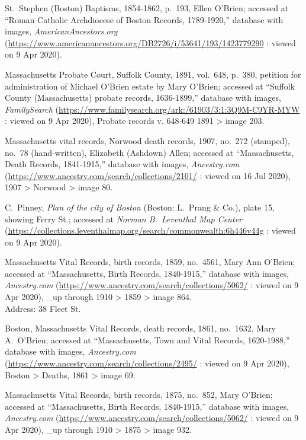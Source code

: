 \begin{thebibliography}{999}
	St.\ Stephen (Boston) Baptisms, 1854-1862, p.\ 193, Ellen O'Brien; accessed at ``Roman Catholic Archdiocese of Boston Records, 1789-1920,'' database with images, \textit{AmericanAncestors.org} (\url{https://www.americanancestors.org/DB2726/i/53641/193/1423779290} : viewed on 9 Apr 2020).
	
	Massachusetts Probate Court, Suffolk County, 1891, vol.\ 648, p.\ 380, petition for administration of Michael O'Brien estate by Mary O'Brien; accessed at ``Suffolk County (Massachusetts) probate records, 1636-1899,'' database with images, \textit{FamilySearch} (\url{https://www.familysearch.org/ark:/61903/3:1:3Q9M-C9YR-MYW} : viewed on 9 Apr 2020), Probate records v. 648-649 1891 > image 203.
	
	Massachusetts vital records, Norwood death records, 1907, no.\ 272 (stamped), no.\ 78 (hand-written), Elizabeth (Ashdown) Allen; accessed at ``Massachusetts, Death Records, 1841-1915,'' database with images, \textit{Ancestry.com} (\url{https://www.ancestry.com/search/collections/2101/} : viewed on 16 Jul 2020), 1907 > Norwood > image 80.
	
	C.\ Pinney, \textit{Plan of the city of Boston} (Boston: L.\ Prang \& Co.), plate 15, showing Ferry St.; accessed at \textit{Norman B.\ Leventhal Map Center} (\url{https://collections.leventhalmap.org/search/commonwealth:6h446v44g} : viewed on 9 Apr 2020).	
	
	Massachusetts Vital Records, birth records, 1859, no.\ 4561, Mary Ann O'Brien; accessed at ``Massachusetts, Birth Records, 1840-1915,'' database with images, \textit{Ancestry.com} (\url{https://www.ancestry.com/search/collections/5062/} : viewed on 9 Apr 2020), \_up through 1910 > 1859 > image 864.\\
	Address: 38 Fleet St.
	
	Boston, Massachusetts Vital Records, death records, 1861, no.\ 1632, Mary A.\ O'Brien; accessed at ``Massachusetts, Town and Vital Records, 1620-1988,'' database with images, \textit{Ancestry.com} (\url{https://www.ancestry.com/search/collections/2495/} : viewed on 9 Apr 2020), Boston > Deaths, 1861 > image 69.
	
	Massachusetts Vital Records, birth records, 1875, no.\ 852, Mary O'Brien; accessed at ``Massachusetts, Birth Records, 1840-1915,'' database with images, \textit{Ancestry.com} (\url{https://www.ancestry.com/search/collections/5062/} : viewed on 9 Apr 2020), \_up through 1910 > 1875 > image 932.
	

\end{thebibliography}
